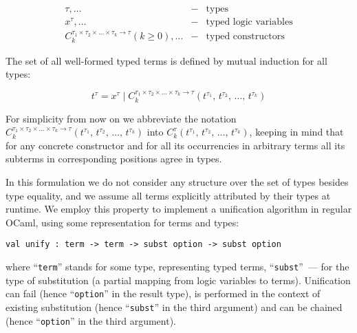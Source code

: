 $$
\begin{array}{rcl}
  \tau,\dots&-&\mbox{types}\\
  x^\tau,\dots&-&\mbox{typed logic variables}\\
  C_k^{\tau_1\times\tau_2\times\dots\times\tau_k\to\tau} (k\ge 0),\dots&-&\mbox{typed constructors}
\end{array}
$$

The set of all well-formed typed terms is defined by mutual induction for all types:

$$
t^\tau=x^\tau\mid C_k^{\tau_1\times\tau_2\times\dots\times\tau_k\to\tau}(t^{\tau_1},\,t^{\tau_2},\,\dots,\,t^{\tau_k})
$$

For simplicity from now on we abbreviate the notation $C_k^{\tau_1\times\tau_2\times\dots\times\tau_k\to\tau}(t^{\tau_1},\,t^{\tau_2},\,\dots,\,t^{\tau_k})$ into 
$C_k^\tau(t^{\tau_1},\,t^{\tau_2},\,\dots,\,t^{\tau_k})$, keeping in mind that for any concrete constructor and for all its occurrencies 
in arbitrary terms all its subterms in corresponding positions agree in types. 

\begin{comment}
We need also to define the notion of a subterm  $t^\tau[p]$ of a term $t^\tau$ at given position $p$:

$$
\begin{array}{rcl}
 p=\epsilon\mid\{1, 2, 3,\dots\}\bullet p&-&\mbox{the set of positions}\\
 t^\tau[\epsilon]=t^\tau&-&\mbox{base case}\\
 C_k^\tau(t_1^{\tau_1},\,t_2^{\tau_2},\dots,\,t_k^{\tau_k})[i\bullet p]=t_i^{\tau_i}[p], 1\le i \le k&-&\mbox{inductive case}
\end{array}
$$
\end{comment}

In this formulation we do not consider any structure over the set of types besides type equality, and we assume all terms explicitly 
attributed by their types at runtime. We employ this property to implement a unification algorithm in regular OCaml, using some
representation for terms and types:

\begin{lstlisting}[mathescape=true]
    val unify : term -> term -> subst option -> subst option
\end{lstlisting}

\noindent where ``\lstinline{term}'' stands for some type, representing typed terms, ``\lstinline{subst}''~--- for the type of 
substitution (a partial mapping from logic variables to terms). Unification can fail (hence ``\lstinline{option}'' in the result type), 
is performed in the context of existing substitution (hence ``\lstinline{subst}'' in the third argument) and can be 
chained (hence ``\lstinline{option}'' in the third argument). 

